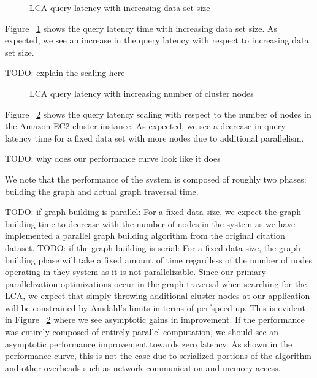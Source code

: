 \documentclass{article}
\begin{document}
\begin{figure}
\centering


\caption{LCA query latency with increasing data set size}
\label{latency_scaling}
\end{figure}

Figure ~\ref{latency_scaling} shows the query latency time with increasing data set size.
As expected, we see an increase in the query latency with respect to increasing data set size. 

TODO: explain the scaling here

\begin{figure}
\centering



\caption{LCA query latency with increasing number of cluster nodes}
\label{node_scaling}
\end{figure}

Figure ~\ref{node_scaling} shows the query latency scaling with respect to the number of nodes in the Amazon EC2 cluster instance.
As expected, we see a decrease in query latency time for a fixed data set with more nodes due to additional parallelism.


TODO: why does our performance curve look like it does

We note that the performance of the system is composed of roughly two phases: building the graph and actual graph traversal time.

TODO: if graph building is parallel: For a fixed data size, we expect the graph building time to decrease with the number of nodes in the system as we have implemented a parallel graph building algorithm from the original citation dataset.
TODO: if the graph building is serial: For a fixed data size, the graph building phase will take a fixed amount of time regardless of the number of nodes operating in they system as it is not parallelizable.
Since our primary parallelization optimizations occur in the graph traversal when searching for the LCA, we expect that simply throwing additional cluster nodes at our application will be constrained by Amdahl's limits in terms of  perfspeed up.
This is evident in Figure ~\ref{node_scaling} where we see asymptotic gains in improvement. 
If the performance was entirely composed of entirely parallel computation, we should see an asymptotic performance improvement towards zero latency.
As shown in the performance curve, this is not the case due to serialized portions of the algorithm and other overheads such as network communication and memory access.
\end{document}
